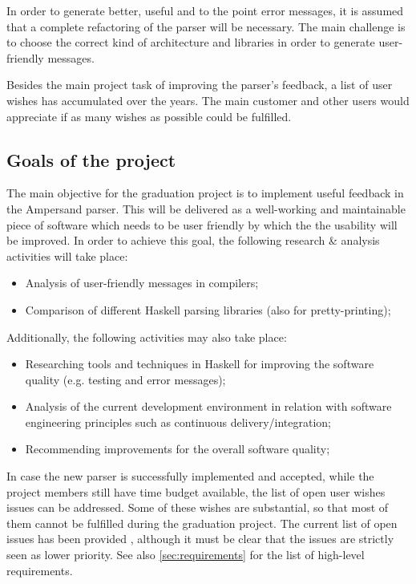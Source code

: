 In order to generate better, useful and to the point error messages, it is assumed that a complete refactoring of the parser will be necessary.
The main challenge is to choose the correct kind of architecture and libraries in order to generate user-friendly messages.

Besides the main project task of improving the parser's feedback, a list of user wishes has accumulated over the years.
The main customer and other users would appreciate if as many wishes as possible could be fulfilled.

\subsection{Goals of the project}
\label{subsec:project-goals}
The main objective for the graduation project is to implement useful feedback in the Ampersand parser.
This will be delivered as  a well-working and maintainable piece of software which needs to be user friendly by which the the usability will be improved.
In order to achieve this goal, the following research \& analysis activities will take place:
\begin{itemize}
	\item Analysis of user-friendly messages in compilers;
	\item Comparison of different Haskell parsing libraries (also for pretty-printing);
\end{itemize}
%
Additionally, the following activities may also take place:
\begin{itemize}
	\item Researching tools and techniques in Haskell for improving the software quality (e.g. testing and error messages);
	\item Analysis of the current development environment in relation with software engineering principles such as continuous delivery/integration;
	\item Recommending improvements for the overall software quality;
\end{itemize}
%
In case the new parser is successfully implemented and accepted, while the project members still have time budget available, the list of open user wishes issues can be addressed.
Some of these wishes are substantial, so that most of them cannot be fulfilled during the graduation project.
The current list of open issues has been provided \cite{open-issues}, although it must be clear that the issues are strictly seen as lower priority.
See also \autoref{sec:requirements} for the list of high-level requirements.


